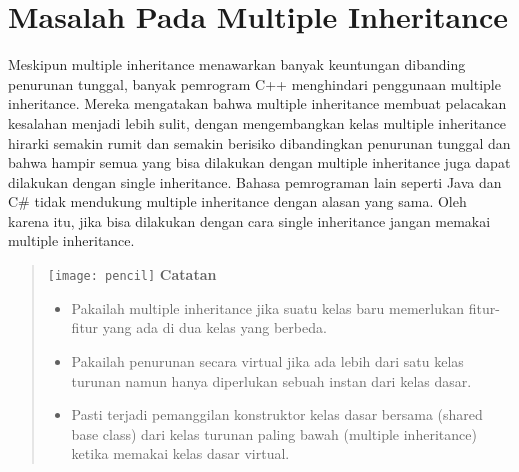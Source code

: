 \section{Masalah Pada Multiple Inheritance}\label{masalah-pada-multiple-inheritance}

Meskipun multiple inheritance menawarkan banyak keuntungan dibanding
penurunan tunggal, banyak pemrogram C++ menghindari penggunaan multiple
inheritance. Mereka mengatakan bahwa multiple inheritance membuat
pelacakan kesalahan menjadi lebih sulit, dengan mengembangkan kelas
multiple inheritance hirarki semakin rumit dan semakin berisiko
dibandingkan penurunan tunggal dan bahwa hampir semua yang bisa
dilakukan dengan multiple inheritance juga dapat dilakukan dengan single
inheritance. Bahasa pemrograman lain seperti Java dan C\# tidak
mendukung multiple inheritance dengan alasan yang sama. Oleh karena itu,
jika bisa dilakukan dengan cara single inheritance jangan memakai
multiple inheritance.

\begin{quotation}
\texttt{[image: pencil]}	\textbf{Catatan}
	\begin{itemize}
		\item Pakailah multiple inheritance jika suatu kelas baru memerlukan
		fitur-fitur yang ada di dua kelas yang berbeda.
		\item Pakailah penurunan secara virtual jika ada lebih dari satu kelas turunan
		namun hanya diperlukan sebuah instan dari kelas dasar.
		\item Pasti terjadi pemanggilan konstruktor kelas dasar bersama (shared base
		class) dari kelas turunan paling bawah (multiple inheritance) ketika
		memakai kelas dasar virtual.
	\end{itemize}
\end{quotation}
 

